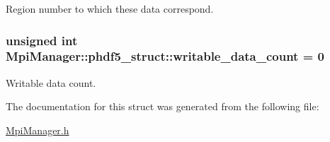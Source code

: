 Region number to which these data correspond. 

\subsubsection[{\texorpdfstring{writable\+\_\+data\+\_\+count}{writable_data_count}}]{\setlength{\rightskip}{0pt plus 5cm}unsigned int Mpi\+Manager\+::phdf5\+\_\+struct\+::writable\+\_\+data\+\_\+count = 0}\hypertarget{struct_mpi_manager_1_1phdf5__struct_a5b487966cec847dfba96a869e9adb7f0}{}\label{struct_mpi_manager_1_1phdf5__struct_a5b487966cec847dfba96a869e9adb7f0}


Writable data count. 



The documentation for this struct was generated from the following file\+:\begin{DoxyCompactItemize}
\item 
\hyperlink{_mpi_manager_8h}{Mpi\+Manager.\+h}\end{DoxyCompactItemize}
